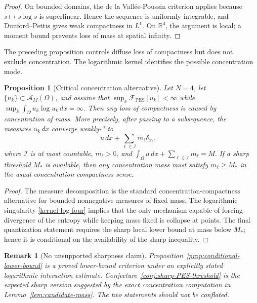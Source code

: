 \documentclass[pdflatex,sn-mathphys-num]{sn-jnl}%
\theoremstyle{thmstyleone}
\newtheorem{proposition}[theorem]{Proposition}%
\theoremstyle{thmstyletwo}
\newtheorem{remark}{Remark}
\theoremstyle{thmstylethree}
\begin{document}
\begin{proof}
On bounded domains, the de la Vallée-Poussin criterion applies because
\(s\mapsto s\log s\) is superlinear.  Hence the sequence is uniformly
integrable, and Dunford--Pettis gives weak compactness in \(L^1\).  On
\(\mathbb R^4\), the argument is local; a moment bound prevents loss of mass at
spatial infinity.
\end{proof}

The preceding proposition controls diffuse loss of compactness but does not
exclude concentration.  The logarithmic kernel identifies the possible
concentration mode.

\begin{proposition}[Critical concentration alternative]
\label{prop:concentration-alternative}
Let \(N=4\), let \(\{u_k\}\subset\mathcal A_M(\Omega)\), and assume that
\(\sup_k\mathcal F_{\mathrm{PES}}[u_k]<\infty\) while
\(\sup_k\int_\Omega u_k\log u_k\,dx=\infty\).  Then any loss of compactness is
caused by concentration of mass.  More precisely, after passing to a
subsequence, the measures \(u_k\,dx\) converge weakly-* to
\begin{equation}
        u\,dx+\sum_{\ell\in\mathcal I}m_\ell\delta_{x_\ell},
\label{measure-decomposition}
\end{equation}
where \(\mathcal I\) is at most countable, \(m_\ell>0\), and
\(\int_\Omega u\,dx+\sum_{\ell\in\mathcal I}m_\ell=M\).  If a sharp threshold
\(M_*\) is available, then any concentration mass must satisfy
\(m_\ell\ge M_*\) in the usual concentration-compactness sense.
\end{proposition}

\begin{proof}
The measure decomposition is the standard concentration-compactness
alternative for bounded nonnegative measures of fixed mass.  The logarithmic
singularity \eqref{kernel-log-four} implies that the only mechanism capable of
forcing divergence of the entropy while keeping mass fixed is collapse at
points.  The final quantization statement requires the sharp local lower bound
at mass below \(M_*\); hence it is conditional on the availability of the sharp
inequality.
\end{proof}

\begin{remark}[No unsupported sharpness claim]
\label{rem:no-unsupported-sharpness}
Proposition~\ref{prop:conditional-lower-bound} is a proved lower-bound
criterion under an explicitly stated logarithmic interaction estimate.
Conjecture~\ref{conj:sharp-PES-threshold} is the expected sharp version
suggested by the exact concentration computation in
Lemma~\ref{lem:candidate-mass}.  The two statements should not be conflated.
\end{remark}
\end{document}

